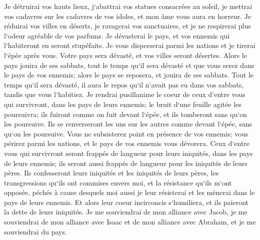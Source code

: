 \verse Je détruirai vos hauts lieux, j`abattrai vos statues consacrées au soleil, je mettrai vos cadavres sur les cadavres de vos idoles, et mon âme vous aura en horreur. 
\verse Je réduirai vos villes en déserts, je ravagerai vos sanctuaires, et je ne respirerai plus l`odeur agréable de vos parfums. 
\verse Je dévasterai le pays, et vos ennemis qui l`habiteront en seront stupéfaits. 
\verse Je vous disperserai parmi les nations et je tirerai l`épée après vous. Votre pays sera dévasté, et vos villes seront désertes. 
\verse Alors le pays jouira de ses sabbats, tout le temps qu`il sera dévasté et que vous serez dans le pays de vos ennemis; alors le pays se reposera, et jouira de ses sabbats. 
\verse Tout le temps qu`il sera dévasté, il aura le repos qu`il n`avait pas eu dans vos sabbats, tandis que vous l`habitiez. 
\verse Je rendrai pusillanime le coeur de ceux d`entre vous qui survivront, dans les pays de leurs ennemis; le bruit d`une feuille agitée les poursuivra; ils fuiront comme on fuit devant l`épée, et ils tomberont sans qu`on les poursuive. 
\verse Ils se renverseront les uns sur les autres comme devant l`épée, sans qu`on les poursuive. Vous ne subsisterez point en présence de vos ennemis; 
\verse vous périrez parmi les nations, et le pays de vos ennemis vous dévorera. 
\verse Ceux d`entre vous qui survivront seront frappés de langueur pour leurs iniquités, dans les pays de leurs ennemis; ils seront aussi frappés de langueur pour les iniquités de leurs pères. 
\verse Ils confesseront leurs iniquités et les iniquités de leurs pères, les transgressions qu`ils ont commises envers moi, et la résistance qu`ils m`ont opposée, 
\verse péchés à cause desquels moi aussi je leur résisterai et les mènerai dans le pays de leurs ennemis. Et alors leur coeur incirconcis s`humiliera, et ils paieront la dette de leurs iniquités. 
\verse Je me souviendrai de mon alliance avec Jacob, je me souviendrai de mon alliance avec Isaac et de mon alliance avec Abraham, et je me souviendrai du pays. 
